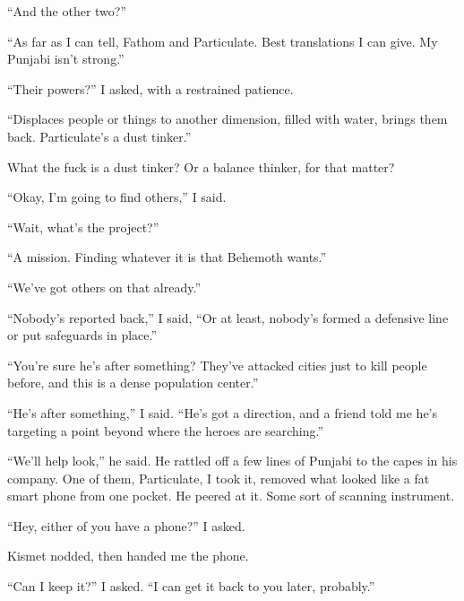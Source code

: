 ``And the other two?''



``As far as I can tell, Fathom and Particulate.  Best translations I can give.  My Punjabi isn't strong.''



``Their powers?'' I asked, with a restrained patience.



``Displaces people or things to another dimension, filled with water, brings them back.  Particulate's a dust tinker.''



What the fuck is a dust tinker?  Or a balance thinker, for that matter?



``Okay, I'm going to find others,'' I said.



``Wait, what's the project?''



``A mission.  Finding whatever it is that Behemoth wants.''



``We've got others on that already.''



``Nobody's reported back,'' I said, ``Or at least, nobody's formed a defensive line or put safeguards in place.''



``You're sure he's after something?  They've attacked cities just to kill people before, and this is a dense population center.''



``He's after something,'' I said\emph{. }``He's got a direction, and a friend told me he's targeting a point beyond where the heroes are searching.''



``We'll help look,'' he said. He rattled off a few lines of Punjabi to the capes in his company.  One of them, Particulate, I took it, removed what looked like a fat smart phone from one pocket.  He peered at it.  Some sort of scanning instrument.



``Hey, either of you have a phone?''  I asked.



Kismet nodded, then handed me the phone.



``Can I keep it?''  I asked.  ``I can get it back to you later, probably.''



